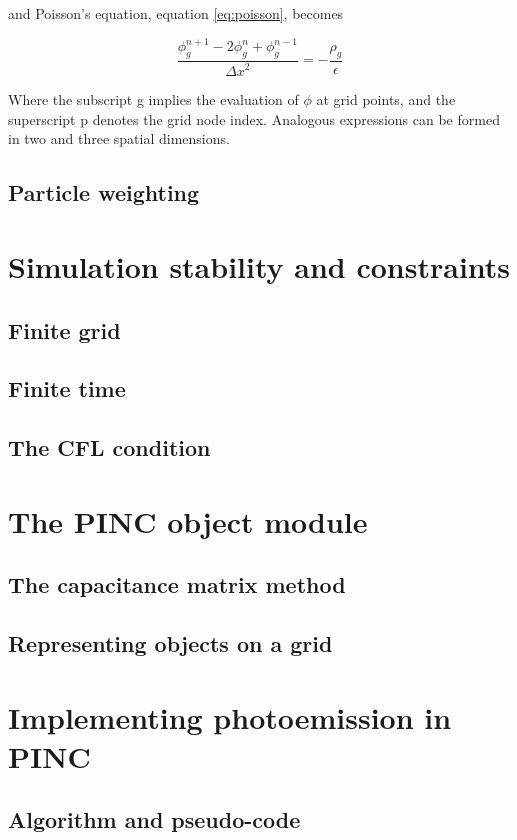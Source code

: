and Poisson's equation, equation \ref{eq:poisson}, becomes

\begin{equation}\label{eq:poissonDescrete}
    \frac{\phi^{n+1}_g - 2\phi^n_g + \phi^{n-1}_g}{{\Delta x}^2} = - \frac{\rho_g}{\epsilon}
\end{equation}


Where the subscript g implies the evaluation of $\phi$ at grid points, and the superscript p denotes the grid node index. Analogous expressions can be formed in two and three spatial dimensions.

\subsection{Particle weighting}

\section{Simulation stability and constraints}
\subsection{Finite grid}
\subsection{Finite time}
\subsection{The CFL condition}





\section{The PINC object module}
\subsection{The capacitance matrix method}
\subsection{Representing objects on a grid}

\section{Implementing photoemission in PINC}
\subsection{Algorithm and pseudo-code}
